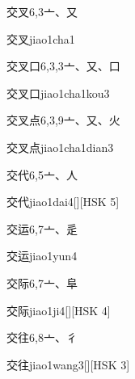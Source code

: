 \begin{Entry}{交叉}{6,3}{⼇、⼜}
  \begin{Phonetics}{交叉}{jiao1cha1}
  \end{Phonetics}
\end{Entry}

\begin{Entry}{交叉口}{6,3,3}{⼇、⼜、⼝}
  \begin{Phonetics}{交叉口}{jiao1cha1kou3}
  \end{Phonetics}
\end{Entry}

\begin{Entry}{交叉点}{6,3,9}{⼇、⼜、⽕}
  \begin{Phonetics}{交叉点}{jiao1cha1dian3}
  \end{Phonetics}
\end{Entry}

\begin{Entry}{交代}{6,5}{⼇、⼈}
  \begin{Phonetics}{交代}{jiao1dai4}[][HSK 5]
  \end{Phonetics}
\end{Entry}

\begin{Entry}{交运}{6,7}{⼇、⾡}
  \begin{Phonetics}{交运}{jiao1yun4}
  \end{Phonetics}
\end{Entry}

\begin{Entry}{交际}{6,7}{⼇、⾩}
  \begin{Phonetics}{交际}{jiao1ji4}[][HSK 4]
  \end{Phonetics}
\end{Entry}

\begin{Entry}{交往}{6,8}{⼇、⼻}
  \begin{Phonetics}{交往}{jiao1wang3}[][HSK 3]
  \end{Phonetics}
\end{Entry}

